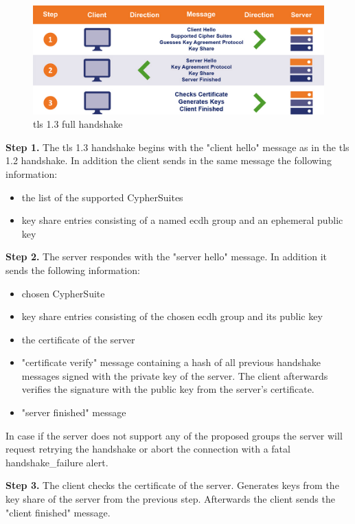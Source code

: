 \begin{figure}[H]
	\centering
		\includegraphics[scale=0.35]{images/handshake1_3.jpg}
	\caption{\gls{tls} 1.3 full handshake \cite{sslstore:handshake}}
	\label{fig:handshake1_3}
\end{figure}

\textbf{Step 1.} The \gls{tls} 1.3 handshake begins with the "client hello" message as in the \gls{tls} 1.2 handshake. In addition the client sends in the same message the following information:

\begin{itemize}
	\item the list of the supported CypherSuites
	\item key share entries consisting of a named \gls{ecdh} group and an ephemeral public key
\end{itemize}

\textbf{Step 2.} The server respondes with the "server hello" message. In addition it sends the following information:

\begin{itemize}
	\item chosen CypherSuite
	\item key share entries consisting of the chosen \gls{ecdh} group and its public key
	\item the certificate of the server
	\item "certificate verify" message containing a hash of all previous handshake messages signed with the private key of the server. The client afterwards verifies the signature with the public key from the server's certificate. 
	\item "server finished" message
\end{itemize}

In case if the server does not support any of the proposed groups the server will request retrying the handshake or abort the connection with a fatal handshake\_failure alert.

\textbf{Step 3.} The client checks the certificate of the server. Generates keys from the key share of the server from the previous step. Afterwards the client sends the "client finished" message. \cite{Hassenstein}\cite{sslstore:handshake}

